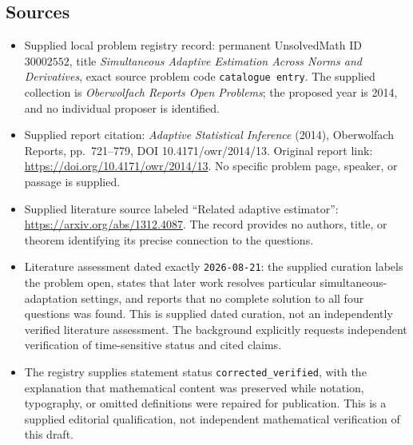 \documentclass[11pt]{article}
\begin{document}
\subsection{Sources}
\begin{itemize}
\item Supplied local problem registry record: permanent UnsolvedMath ID \(30002552\), title \emph{Simultaneous Adaptive Estimation Across Norms and Derivatives}, exact source problem code \texttt{catalogue entry}. The supplied collection is \emph{Oberwolfach Reports Open Problems}; the proposed year is 2014, and no individual proposer is identified.
\item Supplied report citation: \emph{Adaptive Statistical Inference} (2014), Oberwolfach Reports, pp.~721--779, DOI 10.4171/owr/2014/13. Original report link: \url{https://doi.org/10.4171/owr/2014/13}. No specific problem page, speaker, or passage is supplied.
\item Supplied literature source labeled ``Related adaptive estimator'': \url{https://arxiv.org/abs/1312.4087}. The record provides no authors, title, or theorem identifying its precise connection to the questions.
\item Literature assessment dated exactly \texttt{2026-08-21}: the supplied curation labels the problem open, states that later work resolves particular simultaneous-adaptation settings, and reports that no complete solution to all four questions was found. This is supplied dated curation, not an independently verified literature assessment. The background explicitly requests independent verification of time-sensitive status and cited claims.
\item The registry supplies statement status \texttt{corrected\_verified}, with the explanation that mathematical content was preserved while notation, typography, or omitted definitions were repaired for publication. This is a supplied editorial qualification, not independent mathematical verification of this draft.
\end{itemize}
\end{document}
